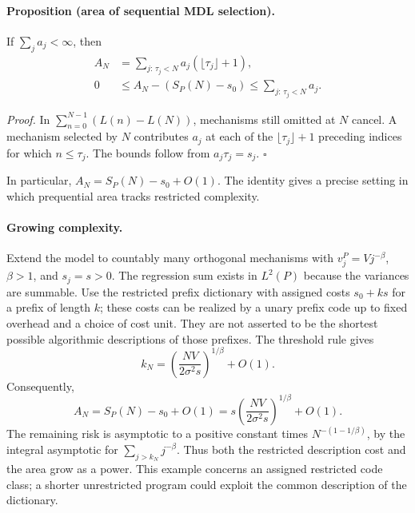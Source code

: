 \documentclass[10pt,a4paper]{article}
\theoremstyle{definition}
\begin{document}
\paragraph{Proposition (area of sequential MDL selection).}
If $\sum_j a_j<\infty$, then
\begin{equation}
 \begin{aligned}
 A_N&=\sum_{j:\,\tau_j<N}a_j(\lfloor\tau_j\rfloor+1),\\
 0&\leq A_N-(S_P(N)-s_0)
       \leq\sum_{j:\,\tau_j<N}a_j .
 \end{aligned}
 \label{eq:pt-exact-area}
\end{equation}

\emph{Proof.}
In $\sum_{n=0}^{N-1}(L(n)-L(N))$, mechanisms still omitted at
$N$ cancel. A mechanism selected by $N$ contributes $a_j$ at
each of the $\lfloor\tau_j\rfloor+1$ preceding indices for
which $n\leq\tau_j$. The bounds follow from
$a_j\tau_j=s_j$. \hfill$\square$

In particular, $A_N=S_P(N)-s_0+O(1)$. The identity gives a precise
setting in which prequential area tracks restricted complexity.

\paragraph{Growing complexity.}
Extend the model to countably many orthogonal mechanisms with
$v_j^P=Vj^{-\beta}$, $\beta>1$, and $s_j=s>0$.
The regression sum exists in $L^2(P)$ because the variances are
summable. Use the restricted prefix dictionary with assigned costs
$s_0+ks$ for a prefix of length $k$; these costs can be realized
by a unary prefix code up to fixed overhead and a choice of cost
unit. They are not asserted to be the shortest possible
algorithmic descriptions of those prefixes.
The threshold rule gives
\[
 k_N=\left(\frac{NV}{2\sigma^2s}\right)^{1/\beta}+O(1).
\]
Consequently,
\begin{equation}
 A_N=S_P(N)-s_0+O(1)
     =s\left(\frac{NV}{2\sigma^2s}\right)^{1/\beta}+O(1).
 \label{eq:pt-growing}
\end{equation}
The remaining risk is asymptotic to a positive constant times
$N^{-(1-1/\beta)}$, by the integral asymptotic for
$\sum_{j>k_N}j^{-\beta}$. Thus both the restricted description
cost and the area grow as a power. This example concerns an
assigned restricted code class; a shorter unrestricted program
could exploit the common description of the dictionary.
\end{document}

